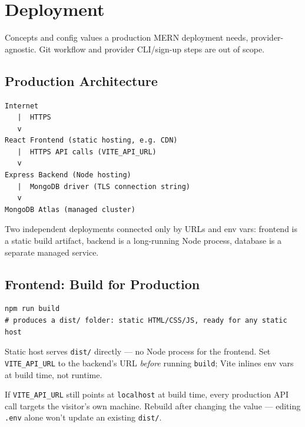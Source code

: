 \chapter{Deployment}

\begin{notebox}[NOTE]
Concepts and config values a production MERN deployment needs, provider-agnostic. Git workflow and provider CLI/sign-up steps are out of scope.
\end{notebox}

\section{Production Architecture}

\begin{diagrambox}
\begin{verbatim}
Internet
   |  HTTPS
   v
React Frontend (static hosting, e.g. CDN)
   |  HTTPS API calls (VITE_API_URL)
   v
Express Backend (Node hosting)
   |  MongoDB driver (TLS connection string)
   v
MongoDB Atlas (managed cluster)
\end{verbatim}
\end{diagrambox}

Two independent deployments connected only by URLs and env vars: frontend is a static build artifact, backend is a long-running Node process, database is a separate managed service.

\section{Frontend: Build for Production}

\begin{lstlisting}
npm run build
# produces a dist/ folder: static HTML/CSS/JS, ready for any static host
\end{lstlisting}

Static host serves \texttt{dist/} directly --- no Node process for the frontend. Set \texttt{VITE\_API\_URL} to the backend's URL \emph{before} running \texttt{build}; Vite inlines env vars at build time, not runtime.

\begin{warnbox}[WARNING]
If \texttt{VITE\_API\_URL} still points at \texttt{localhost} at build time, every production API call targets the visitor's own machine. Rebuild after changing the value --- editing \texttt{.env} alone won't update an existing \texttt{dist/}.
\end{warnbox}

